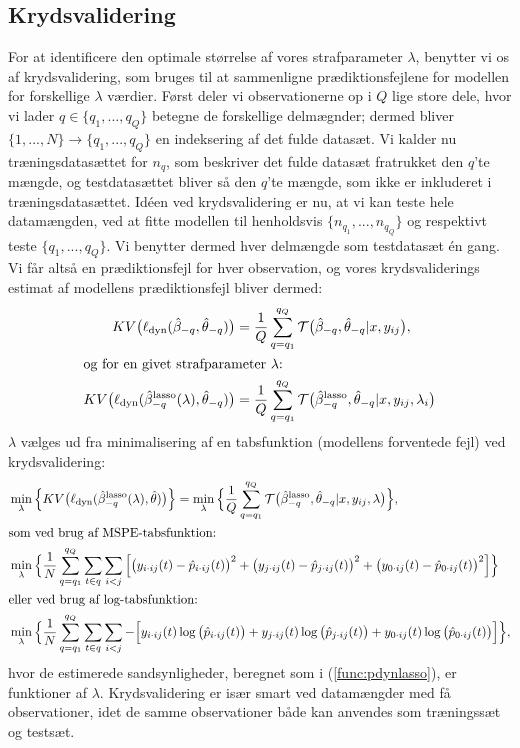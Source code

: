 \documentclass[11pt,a4paper]{article}
\begin{document}
\subsection{Krydsvalidering}
For at identificere den optimale størrelse af vores strafparameter $\lambda$, benytter vi os af krydsvalidering, som bruges til at sammenligne prædiktionsfejlene for modellen for forskellige $\lambda$ værdier. Først deler vi observationerne op i $Q$ lige store dele, hvor vi lader $q\in \{q_1,...,q_Q\}$ betegne de forskellige delmægnder; dermed bliver $\{1,...,N\}\rightarrow\{q_1,...,q_Q\}$ en indeksering af det fulde datasæt. Vi kalder nu træningsdatasættet for $n_q$, som beskriver det fulde datasæt fratrukket den $q$'te mængde, og testdatasættet bliver så den $q$'te mængde, som ikke er inkluderet i træningsdatasættet. Idéen ved krydsvalidering er nu, at vi kan teste hele datamængden, ved at fitte modellen til henholdsvis $\{n_{q_1},...,n_{q_Q}\}$ og respektivt teste $\{q_1,...,q_Q\}$. Vi benytter dermed hver delmængde som testdatasæt én gang. Vi får altså en prædiktionsfejl for hver observation, og vores krydsvaliderings estimat af modellens prædiktionsfejl bliver dermed:
\begin{align*}
KV\big{(}\ell_{\text{dyn}}(\hat{\beta}_{-q},\hat{\theta}_{-q})\big{)}&=\frac{1}{Q}\sum_{q=q_1}^{q_Q}\mathcal{T}\big{(}\hat{\beta}_{-q},\hat{\theta}_{-q}|x,y_{ij}\big{)},\\
\intertext{og for en givet strafparameter $\lambda$:}
KV\big{(}\ell_{\text{dyn}}(\hat{\beta}_{-q}^{\text{lasso}}(\lambda),\hat{\theta}_{-q})\big{)}&=\frac{1}{Q}\sum_{q=q_1}^{q_Q}\mathcal{T}\big{(}\hat{\beta}_{-q}^{\text{lasso}},\hat{\theta}_{-q}|x,y_{ij},\lambda_i\big{)}
\end{align*}
$\lambda$ vælges ud fra minimalisering af en tabsfunktion (modellens forventede fejl) ved krydsvalidering:
\begin{align*}
&\min_{\lambda}\Big{\{}KV\big{(}\ell_{\text{dyn}}(\hat{\beta}_{-q}^{\text{lasso}}(\lambda),\hat{\theta})\big{)}\Big{\}}=\min_{\lambda}\Big{\{}\frac{1}{Q}\sum_{q=q_1}^{q_Q}\mathcal{T}\big{(}\hat{\beta}_{-q}^{\text{lasso}},\hat{\theta}_{-q}|x,y_{ij},\lambda\big{)}\Big{\}},\\
\intertext{som ved brug af MSPE-tabsfunktion:}
&\min_{\lambda}\Big{\{}\frac{1}{N}\sum_{q=q_1}^{q_Q}\sum_{t\in q}\sum_{i<j}\Big{[}\big{(}y_{i\cdot ij}(t)-\hat{p}_{i\cdot ij}(t)\big{)}^2+\big{(}y_{j\cdot ij}(t)-\hat{p}_{j\cdot ij}(t)\big{)}^2+\big{(}y_{0\cdot ij}(t)-\hat{p}_{0\cdot ij}(t)\big{)}^2\Big{]}\Big{\}}\\
\intertext{eller ved brug af log-tabsfunktion:}
&\min_{\lambda}\Big{\{}\frac{1}{N}\sum_{q=q_1}^{q_Q}\sum_{t\in q}\sum_{i<j}-\Big{[}y_{i\cdot ij}(t)\log\big{(}\hat{p}_{i\cdot ij}(t)\big{)}+y_{j\cdot ij}(t)\log\big{(}\hat{p}_{j\cdot ij}(t)\big{)}+y_{0\cdot ij}(t)\log\big{(}\hat{p}_{0\cdot ij}(t)\big{)}\Big{]}\Big{\}},
\end{align*}
hvor de estimerede sandsynligheder, beregnet som i (\ref{func:pdynlasso}), er funktioner af $\lambda$. Krydsvalidering er især smart ved datamængder med få observationer, idet de samme observationer både kan anvendes som træningssæt og testsæt.
\end{document}
